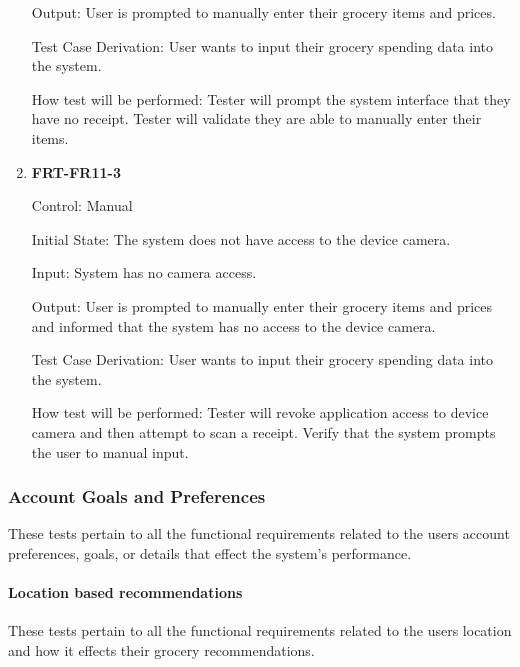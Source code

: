 \documentclass[12pt, titlepage]{article}
\begin{document}
\begin{enumerate}
Output: User is prompted to manually enter their grocery items and prices.

Test Case Derivation: User wants to input their grocery spending data into the system.
          
How test will be performed: Tester will prompt the system interface that they have no receipt. Tester will validate they are able to manually enter their items.

\item{\textbf{FRT-FR11-3}}

Control: Manual
          
Initial State: The system does not have access to the device camera.

Input: System has no camera access.
          
Output: User is prompted to manually enter their grocery items and prices and informed that the system has no access to the device camera.

Test Case Derivation: User wants to input their grocery spending data into the system.
          
How test will be performed: Tester will revoke application access to device camera and then attempt to scan a receipt. Verify that the system prompts the user to manual input.

\end{enumerate}

\subsubsection{Account Goals and Preferences}

These tests pertain to all the functional requirements related to the users account preferences, goals, or details that effect the system's performance.

\paragraph{Location based recommendations}

These tests pertain to all the functional requirements related to the users location and how it effects their grocery recommendations.
\end{document}
